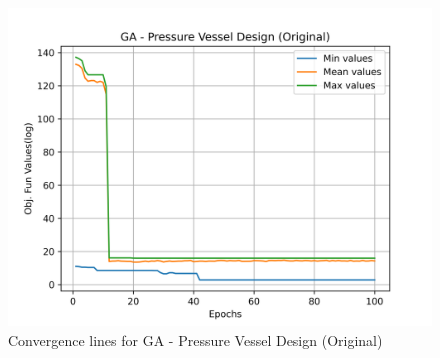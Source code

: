 \begin{figure}[H]
        \centering
        \caption{Convergence lines for GA - Pressure Vessel Design (Original)}
        \label{fig:pressure_vessel_problem_original_solve_ga}
        \includegraphics[scale=0.5]{images/pressure_vessel_problem_original_solve_ga.png}
        \end{figure}
        